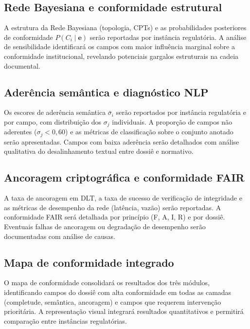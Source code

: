 \documentclass[preprint,12pt,authoryear]{elsarticle}
\begin{document}
\subsection{Rede Bayesiana e conformidade estrutural}
\label{subsec:res_bayes}

A estrutura da Rede Bayesiana (topologia, CPTs) e as probabilidades posteriores de conformidade $P(C_i \mid \mathbf{e})$ serão reportadas por instância regulatória. A análise de sensibilidade identificará os campos com maior influência marginal sobre a conformidade institucional, revelando potenciais gargalos estruturais na cadeia documental.

\subsection{Aderência semântica e diagnóstico NLP}
\label{subsec:res_sbert}

Os escores de aderência semântica $\bar{\sigma}_i$ serão reportados por instância regulatória e por campo, com distribuição dos $\sigma_j$ individuais. A proporção de campos não aderentes ($\sigma_j < 0{,}60$) e as métricas de classificação sobre o conjunto anotado serão apresentadas. Campos com baixa aderência serão detalhados com análise qualitativa do desalinhamento textual entre dossiê e normativo.

\subsection{Ancoragem criptográfica e conformidade FAIR}
\label{subsec:res_dlt}

A taxa de ancoragem em DLT, a taxa de sucesso de verificação de integridade e as métricas de desempenho da rede (latência, vazão) serão reportadas. A conformidade FAIR será detalhada por princípio (F, A, I, R) e por dossiê. Eventuais falhas de ancoragem ou degradação de desempenho serão documentadas com análise de causas.

\subsection{Mapa de conformidade integrado}
\label{subsec:res_map}

O mapa de conformidade consolidará os resultados dos três módulos, identificando campos do dossiê com alta conformidade em todas as camadas (completude, semântica, ancoragem) e campos que requerem intervenção prioritária. A representação visual integrará resultados quantitativos e permitirá comparação entre instâncias regulatórias.
\end{document}
